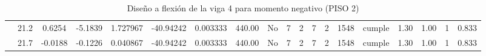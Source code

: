 \begin{table}[H]
{\begin{tabular}{|c|c|c|c|c|c|r|c|c|c|c|c|c|c|c|c|c|c|c|}
\cline{2-19}        & 21.2 & 0.6254 & -5.1839 & 1.727967 & -40.94242 & 0.003333 & 440.00 & No  & 7   & 2   & 7   & 2   & 1548 & \cellcolor[rgb]{ .776,  .937,  .808}cumple & 1.30 & 1.00 & 1   & 0.833 \bigstrut\\
\cline{2-19}        & 21.7 & -0.0188 & -0.1226 & 0.040867 & -40.94242 & 0.003333 & 440.00 & No  & 7   & 2   & 7   & 2   & 1548 & \cellcolor[rgb]{ .776,  .937,  .808}cumple & 1.30 & 1.00 & 1   & 0.833 \bigstrut\\
    \hline
    \end{tabular}%
  
  
%
  }
      \caption{Diseño a flexión de la viga 4 para momento negativo (PISO 2) }
  \label{tab:F VG4 P2 M-}%
\end{table}%
